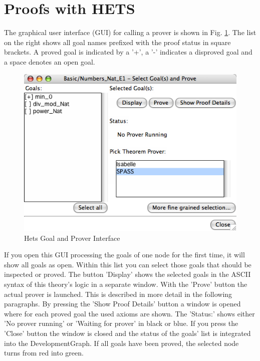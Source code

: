 \documentclass{article}
\newcommand{\normalTEXTSC}[2]{{#1\scriptsize#2}}
\newcommand     {\Hets}{\normalTEXTSC{H}{ETS}\xspace}
\begin{document}
\section{Proofs with \Hets}\label{sec:Proofs}


The graphical user interface (GUI) for calling a prover
is shown in Fig. \ref{fig:proof_window}. The list on the right
shows all goal names prefixed with the proof status in square
brackets. A proved goal is indicated by a '+', a '-' indicates a
disproved goal and a space denotes an open goal.

\begin{figure}
\centering
\includegraphics[width=\textwidth]{proofmanagement1}
\caption{Hets Goal and Prover Interface\label{fig:proof_window}}
\end{figure}

If you open this GUI processing the goals of one node for the first
time, it will show all goals as open. Within this list you can select
those goals that should be inspected or proved. The button 'Display'
shows the selected goals in the ASCII syntax of this theory's logic in
a separate window. With the 'Prove' button the actual prover is
launched. This is described in more detail in the following
paragraphs. By pressing the 'Show Proof Details' button a window is
opened where for each proved goal the used axioms are shown. The
'Status:' shows either 'No prover running' or 'Waiting for prover' in
black or blue. If you press the 'Close' button the window is closed
and the status of the goals' list is integrated into the
DevelopmentGraph. If all goals have been proved, the selected node
turns from red into green.
\end{document}
